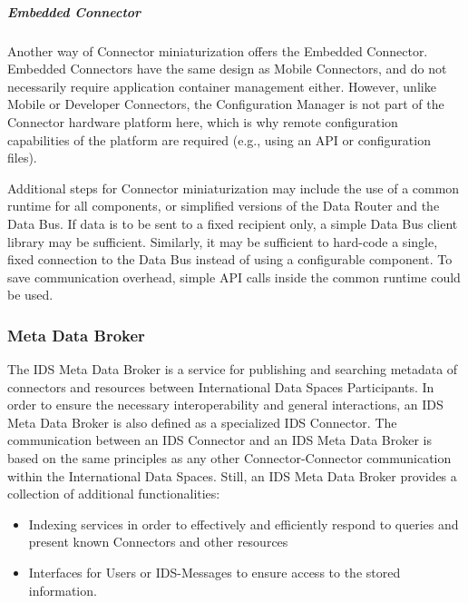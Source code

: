 \subparagraph*{Embedded Connector}
Another way of Connector miniaturization offers the Embedded Connector. Embedded Connectors have the same design as Mobile Connectors, and do not necessarily require application container management either. However, unlike Mobile or Developer Connectors, the Configuration Manager is not part of the Connector hardware platform here, which is why remote configuration capabilities of the platform are required (e.g., using an API or configuration files).

Additional steps for Connector miniaturization may include the use of a common runtime for all components, or simplified versions of the Data Router and the Data Bus. If data is to be sent to a fixed recipient only, a simple Data Bus client library may be sufficient. Similarly, it may be sufficient to hard-code a single, fixed connection to the Data Bus instead of using a configurable component. To save communication overhead, simple API calls inside the common runtime could be used.

\subsubsection{Meta Data Broker}


The IDS Meta Data Broker is a service for publishing and searching metadata of connectors and resources between International Data Spaces Participants. In order to ensure the necessary interoperability and general interactions, an IDS Meta Data Broker is also defined as a specialized IDS Connector. The communication between an IDS Connector and an IDS Meta Data Broker is based on the same principles as any other Connector-Connector communication within the International Data Spaces. Still, an IDS Meta Data Broker provides a collection of additional functionalities:
\begin{itemize}
	\item Indexing services in order to effectively and efficiently respond to queries and present known Connectors and other resources
	\item Interfaces for Users or IDS-Messages to ensure access to the stored information. 
\end{itemize}



